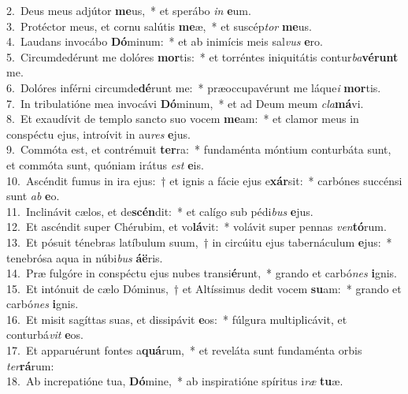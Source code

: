 {2.~}Deus meus adjútor \textbf{me}us,~* et sperábo \textit{in} \textbf{e}um.\\
{3.~}Protéctor meus, et cornu salútis \textbf{me}æ,~* et suscép\textit{tor} \textbf{me}us.\\
{4.~}Laudans invocábo \textbf{Dó}minum:~* et ab inimícis meis sal\textit{vus} \textbf{e}ro.\\
{5.~}Circumdedérunt me dolóres \textbf{mor}tis:~* et torréntes iniquitátis contur\textit{ba}\textbf{vé}\textbf{runt} me.\\
{6.~}Dolóres inférni circumde\textbf{dé}runt me:~* præoccupavérunt me láque\textit{i} \textbf{mor}tis.\\
{7.~}In tribulatióne mea invocávi \textbf{Dó}minum,~* et ad Deum meum \textit{cla}\textbf{má}vi.\\
{8.~}Et exaudívit de templo sancto suo vocem \textbf{me}am:~* et clamor meus in conspéctu ejus, introívit in au\textit{res} \textbf{e}jus.\\
{9.~}Commóta est, et contrémuit \textbf{ter}ra:~* fundaménta móntium conturbáta sunt, et commóta sunt, quóniam irátus \textit{est} \textbf{e}is.\\
{10.~}Ascéndit fumus in ira ejus:~† et ignis a fácie ejus e\textbf{xár}sit:~* carbónes succénsi sunt \textit{ab} \textbf{e}o.\\
{11.~}Inclinávit cælos, et de\textbf{scén}dit:~* et calígo sub pédi\textit{bus} \textbf{e}jus.\\
{12.~}Et ascéndit super Chérubim, et vo\textbf{lá}vit:~* volávit super pennas \textit{ven}\textbf{tó}rum.\\
{13.~}Et pósuit ténebras latíbulum suum,~† in circúitu ejus tabernáculum \textbf{e}jus:~* tenebrósa aqua in núbi\textit{bus} \textbf{á}\textbf{ë}ris.\\
{14.~}Præ fulgóre in conspéctu ejus nubes transi\textbf{é}runt,~* grando et carbó\textit{nes} \textbf{i}gnis.\\
{15.~}Et intónuit de cælo Dóminus,~† et Altíssimus dedit vocem \textbf{su}am:~* grando et carbó\textit{nes} \textbf{i}gnis.\\
{16.~}Et misit sagíttas suas, et dissipávit \textbf{e}os:~* fúlgura multiplicávit, et conturbá\textit{vit} \textbf{e}os.\\
{17.~}Et apparuérunt fontes a\textbf{quá}rum,~* et reveláta sunt fundaménta orbis \textit{ter}\textbf{rá}rum:\\
{18.~}Ab increpatióne tua, \textbf{Dó}mine,~* ab inspiratióne spíritus i\textit{ræ} \textbf{tu}æ.\\
